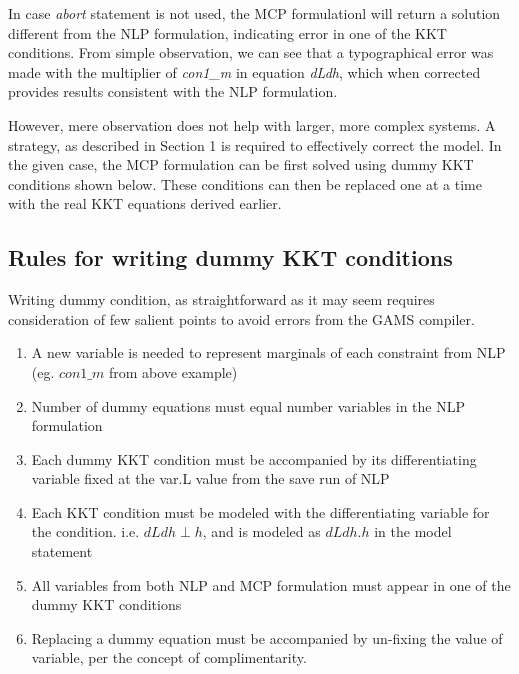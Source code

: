 \documentclass{article}
\begin{document}



\noindent In case \textit{abort} statement is not used, the MCP formulationl will return a solution different from the NLP formulation, indicating
error in one of the KKT conditions. From simple observation, we can see that a typographical error was made with the multiplier of \textit{con1\_m}
in equation \textit{dLdh}, which when corrected provides results consistent with the NLP formulation.

However, mere observation does not help with larger, more complex  systems. A strategy, as described in Section 1 is required to effectively correct the model.
In the given case, the MCP formulation can be first solved using dummy KKT conditions shown below. These conditions can then be replaced
one at a time with the real KKT equations derived earlier.



\subsection{Rules for writing dummy KKT conditions}

Writing dummy condition, as straightforward as it may seem requires consideration of few salient points to avoid errors from the GAMS compiler.

\begin{enumerate}
	\item A new variable is needed to represent marginals of each constraint from NLP (eg. $con1\_m$ from above example)
  \item Number of dummy equations must equal number variables in the NLP formulation
	\item Each dummy KKT condition must be accompanied by its differentiating variable fixed at the var.L value from the save run of NLP
	\item Each KKT condition must be modeled with the differentiating variable for the condition. i.e. $dLdh \perp h$,
        and is modeled as $dLdh.h$ in the model statement
	\item All variables from both NLP and MCP formulation must appear in one of the dummy KKT conditions
  \item Replacing a dummy equation must be accompanied by un-fixing the value of variable, per the concept of complimentarity.

\end{enumerate}
\end{document}
